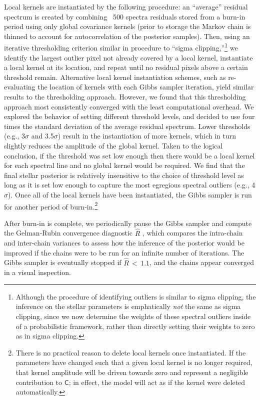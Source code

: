 \documentclass[iop,floatfix]{emulateapj}
\newcommand{\vC}{\mathsf{C}}
\begin{document}
Local kernels are instantiated by the following procedure:  an ``average''
residual spectrum is created by combining ~500 spectra residuals stored from a
burn-in period using only global covariance kernels (prior to storage the
Markov chain is thinned to account for autocorrelation of the posterior
samples). Then, using an iterative thresholding criterion similar in procedure
to ``sigma clipping,''\footnote{Although the procedure of identifying outliers
  is similar to sigma clipping, the inference on the stellar parameters is
  emphatically \emph{not} the same as sigma clipping, since we now determine
  the weights of these spectral outliers inside of a probabilistic framework,
  rather than directly setting their weights to zero as in sigma clipping.} we
  identify the largest outlier pixel not already covered by a local kernel,
  instantiate a local kernel at its location, and repeat until no residual
  pixels above a certain threshold remain. Alternative local kernel
  instantiation schemes, such as re-evaluating the location of kernels with
  each Gibbs sampler iteration, yield similar results to the thresholding
  approach. However, we found that this thresholding approach most consistently
  converged with the least computational overhead. We explored the behavior of
  setting different threshold levels, and decided to use four times the
  standard deviation of the average residual spectrum. Lower thresholds (e.g.,
  3$\sigma$ and 3.5$\sigma$) result in the instantiation of more kernels, which
  in turn slightly reduces the amplitude of the global kernel. Taken to the
  logical conclusion, if the threshold was set low enough then there would be a
  local kernel for each spectral line and no global kernel would be required.
  We find that the final stellar posterior is relatively insensitive to the
  choice of threshold level as long as it is set low enough to capture the most
  egregious spectral outliers (e.g., 4$\sigma$).  Once all of the local kernels
  have been instantiated, the Gibbs sampler is run for another period of
  burn-in.\footnote{There is no practical reason to delete local kernels once
    instantiated.  If the parameters have changed such that a given local
    kernel is no longer required, that kernel amplitude will be driven towards
    zero and represent a negligible contribution to $\vC$; in effect, the model
    will act as if the kernel were deleted automatically.}

After burn-in is complete, we periodically pause the Gibbs sampler and compute the Gelman-Rubin convergence 
diagnostic  $\hat{R}$ \citep[][their Eq.~11.4]{gelman13}, which compares the intra-chain and 
inter-chain variances to assess how the inference of the posterior would be improved if the chains 
were to be run for an infinite number of iterations.  The Gibbs sampler is eventually stopped if 
$\hat{R} \, < \, 1.1$, and the chains appear converged in a visual inspection. 
\end{document}
